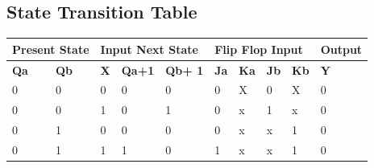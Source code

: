 \documentclass[11pt]{article}
\begin{document}
\subsection{State Transition Table}
\begin{table}[H]
	\begin{tabular}{|ll|lll|llll|l|}
		\hline
		\multicolumn{2}{|l|}{\textbf{Present State}} & \multicolumn{3}{l|}{\textbf{Input Next State}} & \multicolumn{4}{l|}{\textbf{Flip Flop Input}} & \textbf{Output}                                                                                                                                                                         \\ \hline
		\multicolumn{1}{|l|}{\textbf{Qa}}            & \textbf{Qb}                                    & \multicolumn{1}{l|}{\textbf{X}}               & \multicolumn{1}{l|}{\textbf{Qa+1}} & \textbf{Qb+ 1} & \multicolumn{1}{l|}{\textbf{Ja}} & \multicolumn{1}{l|}{\textbf{Ka}} & \multicolumn{1}{l|}{\textbf{Jb}} & \textbf{Kb} & \textbf{Y} \\ \hline
		\multicolumn{1}{|l|}{0}                      & 0                                              & \multicolumn{1}{l|}{0}                        & \multicolumn{1}{l|}{0}             & 0              & \multicolumn{1}{l|}{0}           & \multicolumn{1}{l|}{X}           & \multicolumn{1}{l|}{0}           & X           & 0          \\ \hline
		\multicolumn{1}{|l|}{0}                      & 0                                              & \multicolumn{1}{l|}{1}                        & \multicolumn{1}{l|}{0}             & 1              & \multicolumn{1}{l|}{0}           & \multicolumn{1}{l|}{x}           & \multicolumn{1}{l|}{1}           & x           & 0          \\ \hline
		\multicolumn{1}{|l|}{0}                      & 1                                              & \multicolumn{1}{l|}{0}                        & \multicolumn{1}{l|}{0}             & 0              & \multicolumn{1}{l|}{0}           & \multicolumn{1}{l|}{x}           & \multicolumn{1}{l|}{x}           & 1           & 0          \\ \hline
		\multicolumn{1}{|l|}{0}                      & 1                                              & \multicolumn{1}{l|}{1}                        & \multicolumn{1}{l|}{1}             & 0              & \multicolumn{1}{l|}{1}           & \multicolumn{1}{l|}{x}           & \multicolumn{1}{l|}{x}           & 1           & 0          \\ \hline

\end{tabular}
\end{table}
\end{document}

